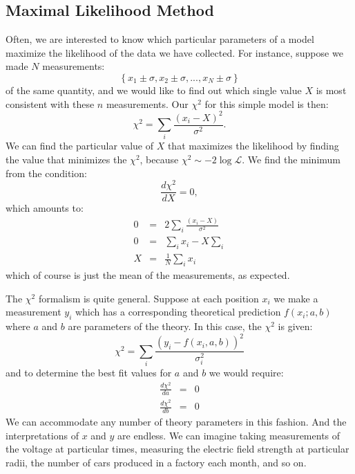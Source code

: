 \documentclass[12pt]{article}
\begin{document}
\subsection{Maximal Likelihood Method}

Often, we are interested to know which particular parameters of a model maximize the likelihood
of the data we have collected.  For instance, suppose we made $N$ measurements:
\begin{displaymath}
\left\{ x_1 \pm \sigma, x_2 \pm \sigma, ..., x_N \pm \sigma \right\}
\end{displaymath}
of the same quantity, and we would like to find out which single value $X$ is most consistent with these $n$ measurements.  Our $\chi^2$ for this simple model is then:
\begin{displaymath}
\chi^2 = \sum_i \frac{(x_i-X)^2}{\sigma^2}.
\end{displaymath}
We can find the particular value of $X$ that maximizes the likelihood by finding the value that minimizes the $\chi^2$, because $\chi^2 \sim - 2 \log \mathcal{L}$.  We find the minimum from the condition:
\begin{displaymath}
\frac{d\chi^2}{dX} = 0,
\end{displaymath}
which amounts to:
\begin{eqnarray}
0 &=& 2 \sum_i \frac{(x_i-X)}{\sigma^2} \nonumber \\
0 &=& \sum_i x_i - X \sum_i \nonumber \\
X &=& \frac{1}{N} \sum_i x_i \label{eqn:mean}
\end{eqnarray}
which of course is just the mean of the measurements, as expected.

The $\chi^2$ formalism is quite general.  Suppose at each position $x_i$ we make a measurement $y_i$ which has a corresponding theoretical prediction $f(x_i; a, b)$ where $a$ and $b$ are parameters of the theory.  In this case, the $\chi^2$ is given:
\begin{displaymath}
\chi^2 = \sum_i \frac{(y_i-f(x_i,a,b))^2}{\sigma_i^2}
\end{displaymath}
and to determine the best fit values for $a$ and $b$ we would require:
\begin{eqnarray*}
\frac{d\chi^2}{da} &=& 0 \\
\frac{d\chi^2}{db} &=& 0 
\end{eqnarray*}
We can accommodate any number of theory parameters in this fashion.  And the interpretations of $x$ and $y$ are endless.  We can imagine taking measurements of the voltage at particular times, measuring the electric field strength at particular radii, the number of cars produced in a factory each month, and so on.
\end{document}
